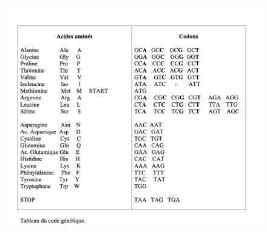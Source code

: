 \begin{figure}[h]
\centering
\includegraphics[scale=0.6]{code}
\end{figure}


\begin{correction}

\end{correction}